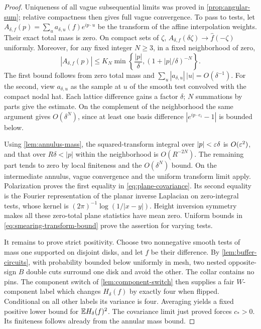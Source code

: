 \begin{proof}
Uniqueness of all vague subsequential limits was proved in
\cref{prop:angular-sum}; relative compactness then gives full vague
convergence. To pass to tests, let
\(A_{\delta,f}(p)=\sum_u a_{\delta,u}(f)e^{ip\cdot u}\) be the transform of
the affine interpolation weights. Their exact total mass is zero. On compact
sets of \(\zeta\),
\(A_{\delta,f}(\delta\zeta)\to\widehat f(-\zeta)\) uniformly. Moreover, for
any fixed integer \(N\ge3\), in a fixed neighborhood of zero,
\begin{equation}
 \label{eq:smearing-transform-bound}
 |A_{\delta,f}(p)|\le K_N
     \min\left\{\frac{|p|}{\delta},
                       (1+|p|/\delta)^{-N}\right\}.
\end{equation}
The first bound follows from zero total mass and
\(\sum_u|a_{\delta,u}|\,|u|=O(\delta^{-1})\). For the second, view
\(a_{\delta,u}\) as the sample at \(u\) of the smooth test convolved with the
compact nodal hat. Each lattice difference gains a factor \(\delta\);
\(N\) summations by parts give the estimate. On the complement of the
neighborhood the same argument gives \(O(\delta^N)\), since at least one
basis difference \(|e^{ip\cdot e_i}-1|\) is bounded below.

Using \cref{lem:annulus-mass}, the squared-transform integral over
\(|p|<\varepsilon\delta\) is \(O(\varepsilon^2)\), and that over
\(R\delta<|p|\) within the neighborhood is \(O(R^{-2N})\). The remaining
part tends to zero by local finiteness and the \(O(\delta^N)\) bound.
On the intermediate annulus, vague convergence and the uniform transform
limit apply. Polarization proves the first equality in
\cref{eq:plane-covariance}. Its second equality is the Fourier representation
of the planar inverse Laplacian on zero-integral tests, whose kernel is
\((2\pi)^{-1}\log(1/|x-y|)\). Height inversion symmetry makes all these
zero-total plane statistics have mean zero. Uniform bounds in
\cref{eq:smearing-transform-bound} prove the assertion for varying tests.

It remains to prove strict positivity. Choose two nonnegative smooth tests
of mass one supported on disjoint disks, and let \(f\) be their difference.
By \cref{lem:buffer-circuits}, with probability bounded below uniformly in
mesh, two nested opposite-sign \(B\) double cuts surround one disk and avoid
the other. The collar contains no pins. The component switch of
\cref{lem:component-switch} then supplies a fair \(W\)-component label which
changes \(H_\delta(f)\) by exactly four when flipped. Conditional on all other
labels its variance is four. Averaging yields a fixed positive lower bound
for \(\mathbb E H_\delta(f)^2\). The covariance limit just proved forces \(c_*>0\).
Its finiteness follows already from the annular mass bound.
\end{proof}

